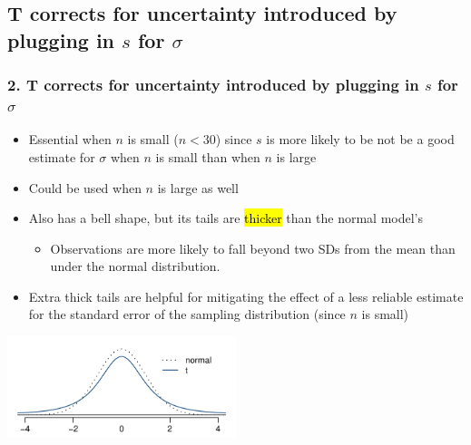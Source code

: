 \documentclass[11pt,containsverbatim,handout,xcolor=xelatex,dvipsnames,table]{beamer}
\begin{document}

\subsection{T corrects for uncertainty introduced by plugging in $s$ for $\sigma$}
\label{mi2}


\begin{frame}
\frametitle{2. T corrects for uncertainty introduced by plugging in $s$ for $\sigma$}

\begin{itemize}

\item Essential when $n$ is small ($n < 30$) since $s$ is more likely to be not be a good estimate for $\sigma$ when $n$ is small than when $n$ is large

\pause

\item Could be used when $n$ is large as well

\pause

\item Also has a bell shape, but its tails are \hl{thicker} than the normal model's
\begin{itemize}
\item Observations are more likely to fall beyond two SDs from the mean than under the normal distribution.
\end{itemize}

\pause

\item Extra thick tails are helpful for mitigating the effect of a less reliable estimate for the standard error of the sampling distribution (since $n$ is small)

\end{itemize}

\begin{center}
\includegraphics[width=0.5\textwidth]{figures/tDistCompareToNormalDist/tDistCompareToNormalDist}
\end{center}

\end{frame}
\end{document}

